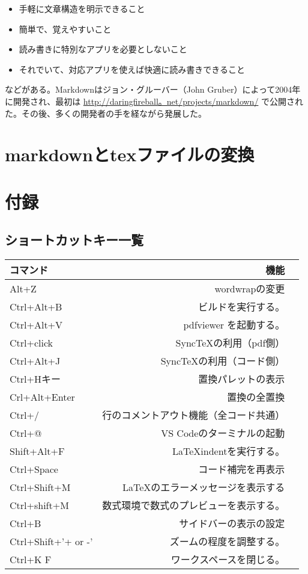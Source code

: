 \documentclass{ltjsarticle}
\begin{document}
\begin{itemize}
  \item 手軽に文章構造を明示できること
  \item 簡単で、覚えやすいこと
  \item 読み書きに特別なアプリを必要としないこと
  \item それでいて、対応アプリを使えば快適に読み書きできること
\end{itemize}

などがある。Markdownはジョン・グルーバー（John Gruber）によって2004年に開発され、最初は \url{http://daringfireball。net/projects/markdown/} で公開された。その後、多くの開発者の手を経ながら発展した。
\section{markdownとtexファイルの変換}

\section{付録}
\subsection*{ショートカットキー一覧}
\begin{center}
  \begin{tabular}{lrr} \hline
    コマンド            & 機能                  \\ \hline
    Alt+Z               & wordwrapの変更        \\
    Ctrl+Alt+B          & ビルドを実行する。       \\
    Ctrl+Alt+V          & pdfviewer を起動する。    \\
    Ctrl+click          & SyncTeXの利用（pdf側）    \\
    Ctrl+Alt+J          & SyncTeXの利用（コード側）    \\
    Ctrl+Hキー          & 置換パレットの表示           \\
    Crl+Alt+Enter       & 置換の全置換              \\
    Ctrl+/              & 行のコメントアウト機能（全コード共通） \\
    Ctrl+@              & VS Codeのターミナルの起動     \\
    Shift+Alt+F         & LaTeXindentを実行する。\\
    Ctrl+Space          & コード補完を再表示\\
    Ctrl+Shift+M        & \LaTeX のエラーメッセージを表示する\\
    Ctrl+shift+M        & 数式環境で数式のプレビューを表示する。\\ 
    Ctrl+B              & サイドバーの表示の設定\\
    Ctrl+Shift+'+ or -' & ズームの程度を調整する。        \\
    Ctrl+K F            & ワークスペースを閉じる。\\ \hline
  \end{tabular}
\end{center}
\end{document}
